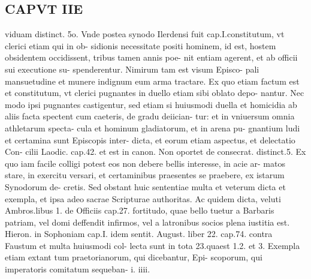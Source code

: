 \documentclass{article}
\begin{document}
\begin{pages}
\section*{CAPVT  IIE }
\marginpar{[ p.135 ]}\pstart viduam distinct. 5o. Vnde postea synodo Ilerdensi fuit cap.I.constitutum, vt clerici etiam qui in ob- sidionis necessitate positi hominem, id est, hostem obsidentem occidissent, tribus tamen annis poe- nit entiam agerent, et ab officii sui executione su- spenderentur. Nimirum tam est visum Episco- pali mansuetudine et munere indignum eum arma tractare. Ex quo etiam factum est et constitutum, vt clerici pugnantes in duello etiam sibi oblato depo- nantur. Nec modo ipsi pugnantes castigentur, sed etiam si huiusmodi duella et homicidia ab aliis facta spectent cum caeteris, de gradu deiician- tur: et in vniuersum omnia athletarum specta- cula et hominum gladiatorum, et in arena pu- gnantium ludi et certamina sunt Episcopis inter- dicta, et eorum etiam aspectus, et delectatio Con- cilii Laodic. cap.42. et est in canon. Non oportet de consecrat. distinct.5. Ex quo iam facile colligi potest eos non debere bellis interesse, in acie ar- matos stare, in exercitu versari, et certaminibus praesentes se praebere, ex istarum Synodorum de- cretis.  \pend\pstart Sed obstant huic sententiae multa et veterum dicta et exempla, et ipsa adeo sacrae Scripturae authoritas. Ac quidem dicta, veluti Ambros.libus  1. de Officiis cap.27. fortitudo, quae bello tuetur a Barbaris patriam, vel domi deffendit infirmos, vel a latronibus socios plena iustitia est. Hieron. in Sophoniam cap.I. idem sentit. August. liber  22. cap.74. contra Faustum et multa huiusmodi col- lecta sunt in tota 23.quaest 1.2. et 3. Exempla etiam extant tum praetorianorum, qui dicebantur, Epi- scoporum, qui imperatoris comitatum sequeban-  i. iiii.  \pend

\end{pages}
\end{document}

